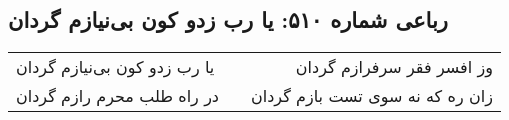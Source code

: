 \begin{center}
\section*{رباعی شماره ۵۱۰: یا رب زدو کون بی‌نیازم گردان}
\label{sec:sh510}
\begin{longtable}{l p{0.5cm} r}
یا رب زدو کون بی‌نیازم گردان
&&
وز افسر فقر سرفرازم گردان
\\
در راه طلب محرم رازم گردان
&&
زان ره که نه سوی تست بازم گردان
\\
\end{longtable}
\end{center}
